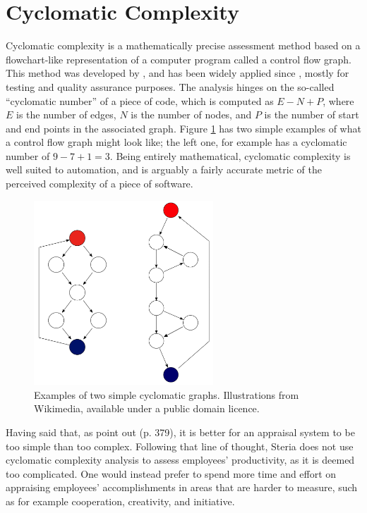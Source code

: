 \documentclass[letterpaper, 12pt]{report}
\begin{document}
\section{Cyclomatic Complexity}
Cyclomatic complexity is a mathematically precise assessment method based on a flowchart-like representation of a computer program called a control flow graph. 
This method was developed by \textcite{mccabe:cyclomatic}, and has been widely applied since \parencite{nist:cyclomatic}, mostly for testing and quality assurance purposes. 
The analysis hinges on the so-called ``cyclomatic number'' of a piece of code, which is computed as $E - N + P$, where $E$ is the number of edges, $N$ is the number of nodes, and $P$ is the number of start and end points in the associated graph. 
Figure \ref{fig:cyclomatic} has two simple examples of what a control flow graph might look like; the left one, for example has a cyclomatic number of $9-7+1=3$.
Being entirely mathematical, cyclomatic complexity is well suited to automation, and is arguably \parencite{angel:howto} a fairly accurate metric of the perceived complexity of a piece of software. 

\begin{figure}[t]
	\centering
	\includegraphics[width=0.6\textwidth]{cyclomatic}
	\caption{Examples of two simple cyclomatic graphs. Illustrations from Wikimedia, available under a public domain licence.}
	\label{fig:cyclomatic}
\end{figure}


Having said that, as \textcite{textbook} point out (p. 379), it is better for an appraisal system to be too simple than too complex.
Following that line of thought, Steria does not use cyclomatic complexity analysis to assess employees' productivity, as it is deemed too complicated.
One would instead prefer to spend more time and effort on appraising employees' accomplishments in areas that are harder to measure, such as for example cooperation, creativity, and initiative.
\end{document}
